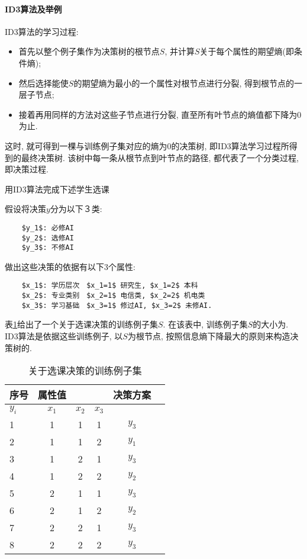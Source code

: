 \paragraph{ID3算法及举例}
ID3算法的学习过程:
\begin{itemize}
\item 首先以整个例子集作为决策树的根节点$S$, 并计算$S$关于每个属性的期望熵(即条件熵);
\item 然后选择能使$S$的期望熵为最小的一个属性对根节点进行分裂, 得到根节点的一层子节点;
\item 接着再用同样的方法对这些子节点进行分裂, 直至所有叶节点的熵值都下降为0为止.
\end{itemize}
这时, 就可得到一棵与训练例子集对应的熵为0的决策树, 即ID3算法学习过程所得到的最终决策树. 该树中每一条从根节点到叶节点的路径, 都代表了一个分类过程, 即决策过程.

\begin{example}
用ID3算法完成下述学生选课

假设将决策$y$分为以下３类:
\begin{Verbatim}
    $y_1$: 必修AI
    $y_2$: 选修AI
    $y_3$: 不修AI
\end{Verbatim}

做出这些决策的依据有以下3个属性:
\begin{Verbatim}
    $x_1$: 学历层次　$x_1=1$ 研究生, $x_1=2$ 本科
    $x_2$: 专业类别　$x_2=1$ 电信类, $x_2=2$ 机电类
    $x_3$: 学习基础　$x_3=1$ 修过AI, $x_3=2$ 未修AI.
\end{Verbatim}
\vspace{-0.45cm}
\end{example}

表\ref{AItable20122435}给出了一个关于选课决策的训练例子集$S$. 在该表中, 训练例子集$S$的大小为. ID3算法是依据这些训练例子, 以$S$为根节点, 按照信息熵下降最大的原则来构造决策树的.
\begin{table} [!tb]
\vspace{-0.2cm}
\caption{关于选课决策的训练例子集}
\vspace{-0.2cm}
\begin{center}
\begin{tabular} {lccccc}
\hline
序号&	属性值	&&&决策方案\\
\hline
$y_i$&$x_1$&$x_2$&$x_3$\\
1	&1	&1	&1&	$y_3$\\
2	&1&	1&	2&	$y_1$\\
3	&1&2&1&$y_3$\\
4&1&2&2&$y_2$\\
5&2&1&1&$y_3$\\
6&2&1&2&$y_2$\\
7&2&2&1&$y_3$\\
8&2&2&2&$y_3$\\
\hline
\end{tabular}
\end{center}
\label{AItable20122435}
\end{table}

